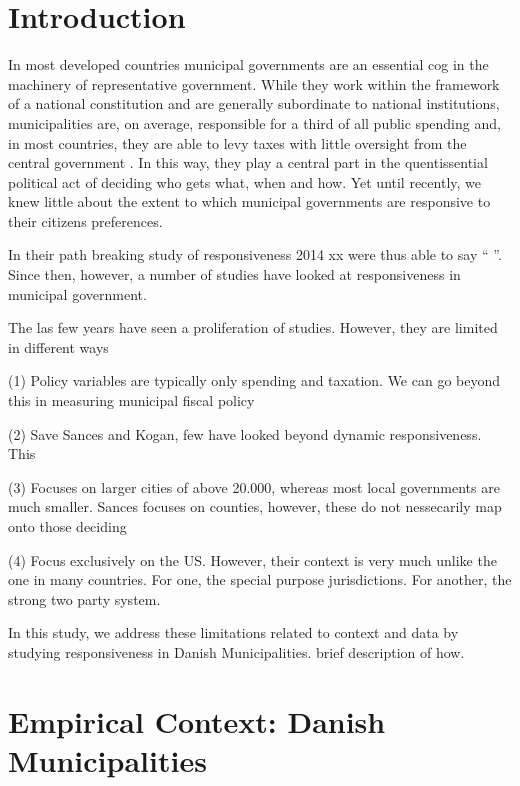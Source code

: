 \documentclass[a4paper,11pt]{article}
\begin{document}
	\bigskip
	
	
	
\section{Introduction}

In most developed countries municipal governments are an essential cog in the machinery of representative government. While they work within the framework of a national constitution and are generally subordinate to national institutions, municipalities are, on average, responsible for a third of all public spending and, in most countries, they are able to levy taxes with little oversight from the central government \cite{oecd2016subnational}. In this way, they play a central part in the quentissential political act of deciding who gets what, when and how.  Yet until recently, we knew little about the extent to which municipal governments are responsive to their citizens preferences. 

In their path breaking study of responsiveness  2014 xx were thus able to say `` ''. Since then, however, a number of studies have looked at responsiveness in municipal government.     

The las few years have seen a proliferation of studies. However, they are limited in different ways

(1) Policy variables are typically only spending and taxation. We can go beyond this in measuring municipal fiscal policy

(2) Save Sances and Kogan, few have looked beyond dynamic responsiveness. This

(3) Focuses on larger cities of above 20.000, whereas most local governments are much smaller. Sances focuses on counties, however, these do not nessecarily map onto those deciding

(4) Focus exclusively on the US. However, their context is very much unlike the one in many countries. For one, the special purpose jurisdictions. For another, the strong two party system. 

In this study, we address these limitations related to context and data by studying responsiveness in Danish Municipalities. brief description of how. 


\section{Empirical Context: Danish Municipalities}	
\end{document}
